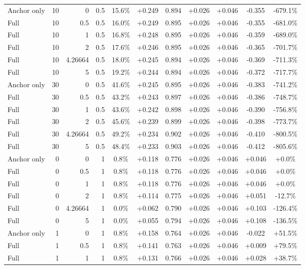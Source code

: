 \begin{table}[htbp]
\begin{tabular}{lrrrccccccc}
Anchor only & 10 & 0 & 0.5 & 15.6\% & +0.249 & 0.894 & +0.026 & +0.046 & -0.355 & -679.1\% \\
Full & 10 & 0.5 & 0.5 & 16.0\% & +0.249 & 0.895 & +0.026 & +0.046 & -0.355 & -681.0\% \\
Full & 10 & 1 & 0.5 & 16.8\% & +0.248 & 0.895 & +0.026 & +0.046 & -0.359 & -689.0\% \\
Full & 10 & 2 & 0.5 & 17.6\% & +0.246 & 0.895 & +0.026 & +0.046 & -0.365 & -701.7\% \\
Full & 10 & 4.26664 & 0.5 & 18.0\% & +0.245 & 0.894 & +0.026 & +0.046 & -0.369 & -711.3\% \\
Full & 10 & 5 & 0.5 & 19.2\% & +0.244 & 0.894 & +0.026 & +0.046 & -0.372 & -717.7\% \\
Anchor only & 30 & 0 & 0.5 & 41.6\% & +0.245 & 0.895 & +0.026 & +0.046 & -0.383 & -741.2\% \\
Full & 30 & 0.5 & 0.5 & 43.2\% & +0.243 & 0.897 & +0.026 & +0.046 & -0.386 & -748.7\% \\
Full & 30 & 1 & 0.5 & 43.6\% & +0.242 & 0.898 & +0.026 & +0.046 & -0.390 & -756.8\% \\
Full & 30 & 2 & 0.5 & 45.6\% & +0.239 & 0.899 & +0.026 & +0.046 & -0.398 & -773.7\% \\
Full & 30 & 4.26664 & 0.5 & 49.2\% & +0.234 & 0.902 & +0.026 & +0.046 & -0.410 & -800.5\% \\
Full & 30 & 5 & 0.5 & 48.4\% & +0.233 & 0.903 & +0.026 & +0.046 & -0.412 & -805.6\% \\
Anchor only & 0 & 0 & 1 & 0.8\% & +0.118 & 0.776 & +0.026 & +0.046 & +0.046 & +0.0\% \\
Full & 0 & 0.5 & 1 & 0.8\% & +0.118 & 0.776 & +0.026 & +0.046 & +0.046 & +0.0\% \\
Full & 0 & 1 & 1 & 0.8\% & +0.118 & 0.776 & +0.026 & +0.046 & +0.046 & +0.0\% \\
Full & 0 & 2 & 1 & 0.8\% & +0.114 & 0.775 & +0.026 & +0.046 & +0.051 & -12.7\% \\
Full & 0 & 4.26664 & 1 & 0.0\% & +0.062 & 0.790 & +0.026 & +0.046 & +0.103 & -126.4\% \\
Full & 0 & 5 & 1 & 0.0\% & +0.055 & 0.794 & +0.026 & +0.046 & +0.108 & -136.5\% \\
Anchor only & 1 & 0 & 1 & 0.8\% & +0.158 & 0.764 & +0.026 & +0.046 & -0.022 & +51.5\% \\
Full & 1 & 0.5 & 1 & 0.8\% & +0.141 & 0.763 & +0.026 & +0.046 & +0.009 & +79.5\% \\
Full & 1 & 1 & 1 & 0.8\% & +0.131 & 0.766 & +0.026 & +0.046 & +0.028 & +38.7\% \\

\end{tabular}
\end{table}
